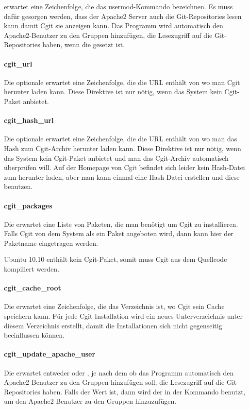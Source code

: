  erwartet eine Zeichenfolge, die das
usermod-Kommando bezeichnen. Es muss dafür gesorgen werden, dass der Apache2
Server auch die Git-Repositories lesen kann damit Cgit sie anzeigen kann. Das
Programm wird automatisch den Apache2-Benutzer zu den Gruppen hinzufügen, die
Lesezugriff auf die Git-Repositories haben, wenn die
 gesetzt ist.

\paragraph{cgit\_url}

Die optionale  erwartet eine Zeichenfolge, die die URL
enthält von wo man Cgit herunter laden kann. Diese Direktive ist nur nötig, wenn
das System kein Cgit-Paket anbietet.

\paragraph{cgit\_hash\_url}

Die optionale  erwartet eine Zeichenfolge, die die
URL enthält von wo man das Hash zum Cgit-Archiv herunter laden kann. Diese
Direktive ist nur nötig, wenn das System kein Cgit-Paket anbietet und man das
Cgit-Archiv automatisch überprüfen will. Auf der Homepage von Cgit befindet sich
leider kein Hash-Datei zum herunter laden, aber man kann einmal eine Hash-Datei
erstellen und diese benutzen.

\paragraph{cgit\_packages}

Die  erwartet eine Liste von Paketen, die man benötigt
um Cgit zu installieren. Falls Cgit von dem System als ein Paket angeboten wird,
dann kann hier der Paketname eingetragen werden.

Ubuntu 10.10 enthält kein Cgit-Paket, somit muss Cgit aus dem Quellcode
kompiliert werden.

\paragraph{cgit\_cache\_root}

Die  erwartet eine Zeichenfolge, die das
Verzeichnis ist, wo Cgit sein Cache speichern kann. Für jede Cgit Installation
wird ein neues Unterverzeichnis unter diesem Verzeichnis erstellt, damit die
Installationen sich nicht gegenseitig beeinflussen können.

\paragraph{cgit\_update\_apache\_user}

Die  erwartet entweder  oder
, je nach dem ob das Programm automatisch den Apache2-Benutzer zu
den Gruppen hinzufügen soll, die Lesezugriff auf die Git-Repositories haben.
Falls der Wert  ist, dann wird der in der
 Kommando benutzt, um den Apache2-Benutzer zu den
Gruppen hinzuzufügen.

